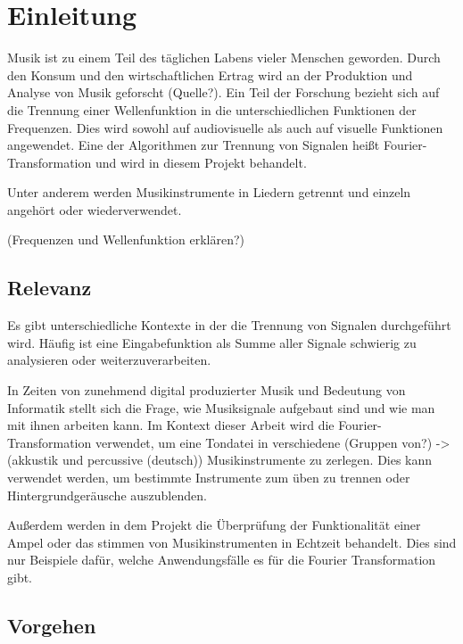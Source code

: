 \chapter{Einleitung}
%

Musik ist zu einem Teil des täglichen Labens vieler Menschen geworden. Durch den Konsum und den wirtschaftlichen Ertrag wird an der Produktion und Analyse von Musik geforscht (Quelle?). Ein Teil der Forschung bezieht sich auf die Trennung einer Wellenfunktion in die unterschiedlichen Funktionen der Frequenzen. Dies wird sowohl auf audiovisuelle als auch auf visuelle Funktionen angewendet. Eine der Algorithmen zur Trennung von Signalen heißt Fourier-Transformation und wird in diesem Projekt behandelt.

\par

Unter anderem werden Musikinstrumente in Liedern getrennt und einzeln angehört oder wiederverwendet.

%
(Frequenzen und Wellenfunktion erklären?)
%

%
\section{Relevanz}
%

Es gibt unterschiedliche Kontexte in der die Trennung von Signalen durchgeführt wird. Häufig ist eine Eingabefunktion als Summe aller Signale schwierig zu analysieren oder weiterzuverarbeiten.

\par

In Zeiten von zunehmend digital produzierter Musik und Bedeutung von Informatik stellt sich die Frage, wie Musiksignale aufgebaut sind und wie man mit ihnen arbeiten kann. Im Kontext dieser Arbeit wird die Fourier-Transformation verwendet, um eine Tondatei in verschiedene (Gruppen von?) -> (akkustik und percussive (deutsch)) Musikinstrumente zu zerlegen. Dies kann verwendet werden, um bestimmte Instrumente zum üben zu trennen oder Hintergrundgeräusche auszublenden.

\par

Außerdem werden in dem Projekt die Überprüfung der Funktionalität einer Ampel oder das stimmen von Musikinstrumenten in Echtzeit behandelt. Dies sind nur Beispiele dafür, welche Anwendungsfälle es für die Fourier Transformation gibt.

%
\section{Vorgehen}
%


